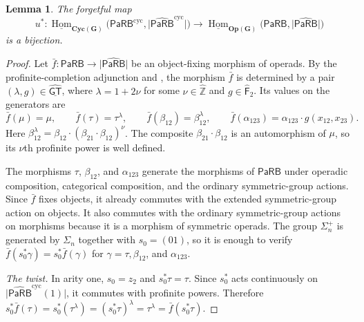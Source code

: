 \documentclass{amsart}
\newcommand{\Grpd}{\mathbf{G}}
\newcommand{\PaRB}{\mathsf{PaRB}}
\newcommand{\Cyc}{\mathbf{Cyc}}
\newcommand{\Op}{\mathbf{Op}}
\newcommand{\Hom}{\operatorname{Hom}}
\newcommand{\GT}{\widehat{\mathsf{GT}}}
\newcommand{\Free}{\mathsf{F}} %
\newtheorem{lemma}[theorem]{Lemma}%
\theoremstyle{definition}
\numberwithin{equation}{section}
\begin{document}
\begin{lemma}
\label{lemma: operad maps lift to cyclic operad maps of PaRB}
The forgetful map
\[
u^*\colon \underline{\Hom}_{\Cyc(\Grpd)} \bigl(\PaRB^{\mathrm{cyc}},
\lvert\widehat{\PaRB}^{\mathrm{cyc}}\rvert\bigr) \longrightarrow \underline{\Hom}_{\Op(\Grpd)} \bigl(\PaRB,\lvert\widehat{\PaRB}\rvert\bigr)
\]
is a bijection. %
\end{lemma}


\begin{proof}
Let $\bar f\colon\PaRB\to\lvert\widehat{\PaRB}\rvert$ be an object-fixing morphism of operads. By the profinite-completion adjunction and
\cite[Propositions~7.3 and~8.1]{Boavida-Horel-Robertson}, the morphism $\bar f$ is determined by a pair $(\lambda,g)\in\underline{\GT}$, where $\lambda=1+2\nu$ for some $\nu\in\widehat{\mathbb Z}$ and $g\in\widehat{\Free}_2$. Its values on the generators are
\begin{equation}\label{eqn:GT-action on ribbons}
   \bar f(\mu)=\mu,\qquad \bar f(\tau)=\tau^\lambda,\qquad \bar f(\beta_{12})=\beta_{12}^\lambda,\qquad \bar f(\alpha_{123}) = \alpha_{123}\cdot g(x_{12},x_{23}). 
\end{equation}
Here $\beta_{12}^{\lambda} =\beta_{12}\cdot(\beta_{21}\cdot\beta_{12})^\nu$. The composite $\beta_{21}\cdot\beta_{12}$ is an automorphism of $\mu$, so its $\nu$th profinite power is well defined.

The morphisms $\tau$, $\beta_{12}$, and $\alpha_{123}$ generate the morphisms of $\PaRB$ under operadic composition, categorical composition, and the ordinary symmetric-group actions. Since $\bar f$ fixes objects, it already commutes with the extended symmetric-group action on objects. It also commutes with the ordinary
symmetric-group actions on morphisms because it is a morphism of symmetric operads. The group $\Sigma_n^+$ is generated by $\Sigma_n$ together with $s_0=(01)$, so it is enough to verify $\bar f(s_0^*\gamma)=s_0^*\bar f(\gamma)$ for $\gamma=\tau,\beta_{12}$, and $\alpha_{123}$.

\smallskip
\noindent\emph{The twist.}
In arity one, $s_0=z_2$ and $s_0^*\tau=\tau$. Since $s_0^*$ acts continuously on $\lvert\widehat{\PaRB}^{\mathrm{cyc}}(1)\rvert$, it commutes with
profinite powers. Therefore $s_0^*\bar f(\tau) = s_0^*(\tau^\lambda) = (s_0^*\tau)^\lambda = \tau^\lambda = \bar f(s_0^*\tau).$



\end{proof}
\end{document}
